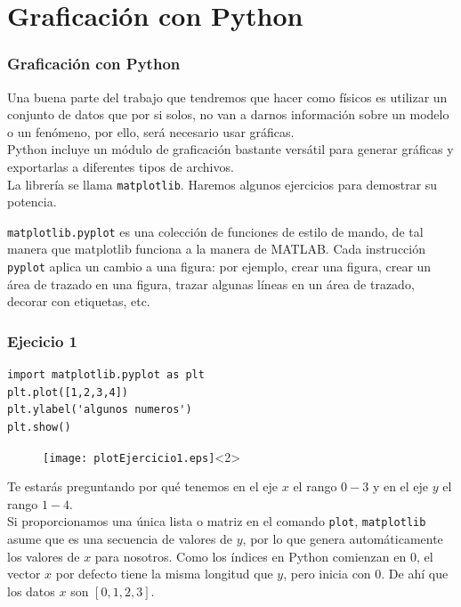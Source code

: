 \section{Graficación con Python}
\begin{frame}
\frametitle{Graficación con Python}
Una buena parte del trabajo que tendremos que hacer como físicos es utilizar un conjunto de datos que por si solos, no van a darnos información sobre un modelo o un fenómeno, por ello, será necesario usar gráficas.
\\
\medskip
Python incluye un módulo de graficación bastante versátil para generar gráficas y exportarlas a diferentes tipos de archivos.
\\
\medskip
La librería se llama \texttt{matplotlib}. Haremos algunos ejercicios para demostrar su potencia.
\end{frame}
\begin{frame}
\texttt{matplotlib.pyplot} es una colección de funciones de estilo de mando, de tal manera que matplotlib funciona a la manera de MATLAB. Cada instrucción \texttt{pyplot} aplica un cambio a una figura: por ejemplo, crear una figura, crear un área de trazado en una figura, trazar algunas líneas en un área de trazado, decorar con etiquetas, etc.
\end{frame}
\begin{frame}[fragile]
\frametitle{Ejecicio 1}
\begin{lstlisting}
import matplotlib.pyplot as plt
plt.plot([1,2,3,4])
plt.ylabel('algunos numeros')
plt.show()
\end{lstlisting}
\begin{figure}
	\centering
	\texttt{[image: plotEjercicio1.eps]}<2> 
\end{figure}
\end{frame}
\begin{frame}
Te estarás preguntando por qué tenemos en el eje $x$ el rango $0-3$ y en el eje $y$ el rango  $1-4$.
\\
\medskip
Si proporcionamos una única lista o matriz en el comando \texttt{plot}, \texttt{matplotlib} asume que es una secuencia de valores de $y$, por lo que genera automáticamente los valores de $x$ para nosotros. Como los índices en Python comienzan en $0$, el vector $x$ por defecto tiene la misma longitud que $y$, pero inicia con 0. De ahí que los datos $x$ son $[0,1,2,3]$.
\end{frame}

